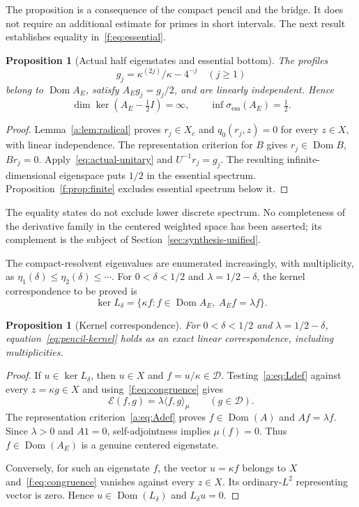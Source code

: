 \documentclass[11pt,a4paper]{article}
\numberwithin{equation}{section}
\newtheorem{proposition}[theorem]{Proposition}
\theoremstyle{definition}\newtheorem{definition}[theorem]{Definition}
\theoremstyle{remark}\newtheorem{remark}[theorem]{Remark}
\newcommand{\E}{\mathcal E}\newcommand{\D}{\mathcal D}
\newcommand{\dom}{\operatorname{Dom}}\newcommand{\Var}{\operatorname{Var}}
\newcommand{\ip}[2]{\langle#1,#2\rangle}\newcommand{\norm}[1]{\lVert#1\rVert}\newcommand{\abs}[1]{\lvert#1\rvert}
\begin{document}
The proposition is a consequence of the compact pencil and the bridge. It does not require an additional estimate for primes in short intervals. The next result establishes equality in~\eqref{f:eq:essential}.


\begin{proposition}[Actual half eigenstates and essential bottom]\label{f:prop:halfeigen}
The profiles
\begin{equation}\label{f:eq:halfprofiles}
 g_j=\kappa^{(2j)}/\kappa-4^{-j}\quad(j\ge1)
\end{equation}
belong to $\dom A_E$, satisfy $A_Eg_j=g_j/2$, and are linearly independent. Hence
\begin{equation}\label{f:eq:exactessential}
 \dim\ker(A_E-\tfrac12I)=\infty,\qquad
 \inf\sigma_{\mathrm{ess}}(A_E)=\tfrac12.
\end{equation}
\end{proposition}
\begin{proof}
Lemma~\ref{a:lem:radical} proves $r_j\in X_c$ and $q_0(r_j,z)=0$ for every $z\in X$, with linear independence. The representation criterion for $B$ gives $r_j\in\dom B$, $Br_j=0$. Apply~\eqref{eq:actual-unitary} and $U^{-1}r_j=g_j$. The resulting infinite-dimensional eigenspace puts $1/2$ in the essential spectrum. Proposition~\ref{f:prop:finite} excludes essential spectrum below it.
\end{proof}
The equality states do not exclude lower discrete spectrum. No completeness of the derivative family in the centered weighted space has been asserted; its complement is the subject of Section~\ref{sec:synthesis-unified}.


The compact-resolvent eigenvalues are enumerated increasingly, with multiplicity, as $\eta_1(\delta)\le\eta_2(\delta)\le\cdots$. For $0<\delta<1/2$ and $\lambda=1/2-\delta$, the kernel correspondence to be proved is
\begin{equation}\label{eq:pencil-kernel}
 \ker L_\delta=\{\kappa f:f\in\dom A_E,\ A_Ef=\lambda f\}.
\end{equation}


\begin{proposition}[Kernel correspondence]\label{f:prop:kernel}
For $0<\delta<1/2$ and $\lambda=1/2-\delta$, equation~\eqref{eq:pencil-kernel} holds as an exact linear correspondence, including multiplicities.
\end{proposition}
\begin{proof}
If $u\in\ker L_\delta$, then $u\in X$ and $f=u/\kappa\in\D$. Testing~\eqref{a:eq:Ldef} against every $z=\kappa g\in X$ and using~\eqref{f:eq:congruence} gives
\[
 \E(f,g)=\lambda\ip{f}{g}_\mu\qquad(g\in\D).
\]
The representation criterion~\eqref{a:eq:Adef} proves $f\in\dom(A)$ and $Af=\lambda f$. Since $\lambda>0$ and $A1=0$, self-adjointness implies $\mu(f)=0$. Thus $f\in\dom(A_E)$ is a genuine centered eigenstate.

Conversely, for such an eigenstate $f$, the vector $u=\kappa f$ belongs to $X$ and~\eqref{f:eq:congruence} vanishes against every $z\in X$. Its ordinary-$L^2$ representing vector is zero. Hence $u\in\dom(L_\delta)$ and $L_\delta u=0$.
\end{proof}
\end{document}

